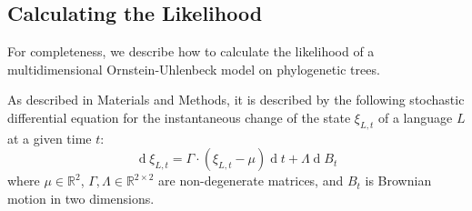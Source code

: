 \documentclass[11pt,a4paper]{article}
\begin{document}



\subsection{Calculating the Likelihood}
For completeness, we describe how to calculate the likelihood of a multidimensional Ornstein-Uhlenbeck model on phylogenetic trees.

As described in Materials and Methods, it is described by the following stochastic differential equation for the instantaneous change of the state $\xi_{L,t}$ of a language $L$ at a given time $t$:
\begin{equation*}
    \operatorname{d}\xi_{L,t} = \Gamma \cdot (\xi_{L,t}-\mu) \operatorname{d}t + \Lambda \operatorname{d}B_t
\end{equation*}
where $\mu \in \mathbb{R}^2$,  $\Gamma, \Lambda \in \mathbb{R}^{2\times 2}$ are non-degenerate matrices, and $B_t$ is Brownian motion in two dimensions.
\end{document}
